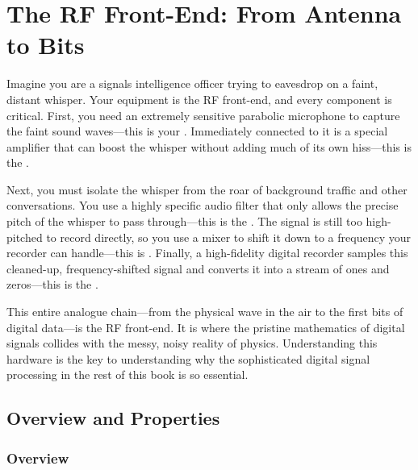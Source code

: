 

\chapter{The RF Front-End: From Antenna to Bits}
\label{ch:rf-front-end}

\begin{nontechnical}
    Imagine you are a signals intelligence officer trying to eavesdrop on a faint, distant whisper. Your equipment is the RF front-end, and every component is critical. First, you need an extremely sensitive parabolic microphone to capture the faint sound waves—this is your . Immediately connected to it is a special amplifier that can boost the whisper without adding much of its own hiss—this is the .

    Next, you must isolate the whisper from the roar of background traffic and other conversations. You use a highly specific audio filter that only allows the precise pitch of the whisper to pass through—this is the . The signal is still too high-pitched to record directly, so you use a mixer to shift it down to a frequency your recorder can handle—this is . Finally, a high-fidelity digital recorder samples this cleaned-up, frequency-shifted signal and converts it into a stream of ones and zeros—this is the .

    This entire analogue chain—from the physical wave in the air to the first bits of digital data—is the RF front-end. It is where the pristine mathematics of digital signals collides with the messy, noisy reality of physics. Understanding this hardware is the key to understanding why the sophisticated digital signal processing in the rest of this book is so essential.
\end{nontechnical}

\section{Overview and Properties}

\subsection{Overview}


